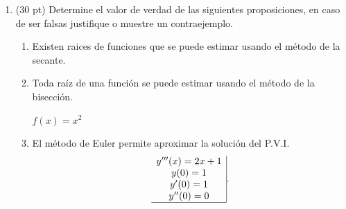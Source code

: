 \documentclass[11pt]{article}
\begin{document}
\begin{enumerate}
\item (30 pt) Determine el valor de verdad de las siguientes proposiciones, en caso de ser falsas justifique o muestre un contraejemplo.
\begin{enumerate}
\item
{} 
    \begin{minipage}{0.4\textwidth} 
	Existen raices de  funciones que se puede estimar usando el m\'etodo de la secante.
    \end{minipage} 
    \begin{minipage}{0.4\textwidth}
    \end{minipage}
%
\item
{} 
    \begin{minipage}{0.4\textwidth}
	Toda ra\'iz de una funci\'on se puede estimar usando el m\'etodo de la bisecci\'on.
    \end{minipage} 
    \begin{minipage}{0.4\textwidth}
    $f(x)=x^2$
    
    \end{minipage}
%
\item
{} 
    \begin{minipage}{0.4\textwidth}
	El método de Euler permite aproximar la soluci\'on del P.V.I. 
    $$
    \begin{array}{c|}
    y'''(x)=2x+1\\
    y(0)=1   \\
    y'(0)=1  \\ 
    y''(0)=0 \\ \hline
    \end{array}.
    $$
    \end{minipage} 
    \begin{minipage}{0.4\textwidth}
    


\end{minipage}
\end{enumerate}
\end{enumerate}
\end{document}
